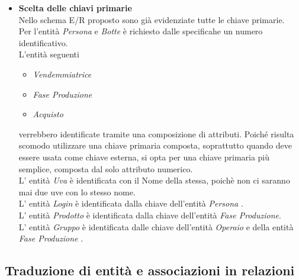 \documentclass{article}
\begin{document}
\begin{itemize}
\item \textbf{Scelta delle chiavi primarie}\\
Nello schema E/R proposto sono già evidenziate tutte le chiave primarie.\\
Per l'entità \textit{Persona} e  \textit{Botte} è richiesto dalle specificahe un numero identificativo.\\
L'entità seguenti 
\begin{itemize}
\item  \textit{Vendemmiatrice}
\item  \textit{Fase Produzione} 
\item  \textit{Acquisto}
\end{itemize} 
verrebbero identificate tramite una composizione di attributi. Poiché risulta scomodo utilizzare una chiave primaria composta, soprattutto quando deve essere usata come chiave esterna, si opta per una chiave primaria più semplice, composta dal solo attributo numerico.\\
L' entità \textit{Uva} è identificata con il Nome della stessa, poichè non ci saranno mai due uve con lo stesso nome.\\
L' entità \textit{Login} è identificata dalla chiave dell'entità  \textit{Persona} .\\
L' entità \textit{Prodotto}  è identificata dalla chiave dell'entità  \textit{Fase Produzione}.\\
L' entità \textit{Gruppo} è identificata dalle chiave dell'entità \textit{Operaio} e della entità \textit{Fase Produzione} .\\
\end{itemize}

\subsection{Traduzione di entità e associazioni in relazioni}
\end{document}
